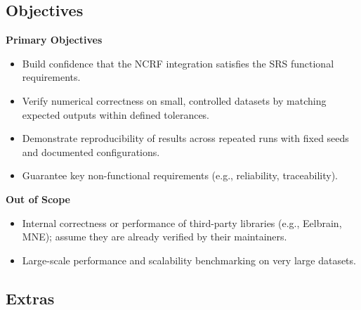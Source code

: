 \documentclass[12pt, titlepage]{article}
\begin{document}
\subsection{Objectives}
\textbf{Primary Objectives}
\begin{itemize}
  \item Build confidence that the NCRF integration satisfies the SRS functional requirements.
  \item Verify numerical correctness on small, controlled datasets by matching expected outputs within defined tolerances.
  \item Demonstrate reproducibility of results across repeated runs with fixed seeds and documented configurations.
  \item Guarantee key non-functional requirements (e.g., reliability, traceability).
\end{itemize}
\textbf{Out of Scope}
\begin{itemize}
  \item Internal correctness or performance of third-party libraries (e.g., Eelbrain, MNE); assume they are already verified by their maintainers.
  \item Large-scale performance and scalability benchmarking on very large datasets.
\end{itemize}



\subsection{Extras}
\end{document}
